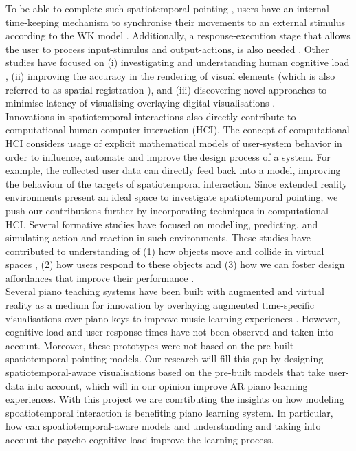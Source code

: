 \documentclass[manuscript,screen]{acmart}
\begin{document}
To be able to complete such spatiotemporal pointing \cite{lee2016modelling}, users have an internal time-keeping mechanism to synchronise their movements to an external stimulus according to the WK model \cite{wing1973response}. Additionally, a response-execution stage that allows the user to process input-stimulus and output-actions, is also needed \cite{wing1973timing}. Other studies have focused on (i) investigating and understanding human cognitive load \cite{radu2009augmented}, (ii) improving the accuracy in the rendering of visual elements (which is also referred to as spatial registration \cite{zheng2013general}), and (iii) discovering novel approaches to minimise latency of visualising overlaying digital visualisations \cite{serafin2017considerations}. \\

Innovations in spatiotemporal interactions also directly contribute to computational human-computer interaction (HCI). The concept of computational HCI considers usage of explicit mathematical models of user-system behavior in order to influence, automate and improve the design process of a system. For example, the collected user data can directly feed back into a model, improving the behaviour of the targets of spatiotemporal interaction. Since extended reality environments present an ideal space to investigate spatiotemporal pointing, we push our contributions further by incorporating techniques in computational HCI. Several formative studies have focused on modelling, predicting, and simulating action and reaction in such environments. These studies have contributed to understanding of (1) how objects move and collide in virtual spaces \cite{lee2017boxer}, (2) how users respond to these objects \cite{lee2016modelling} and (3) how we can foster design affordances that improve their performance \cite{rogers2014piano}.\\

Several piano teaching systems have been built with augmented and virtual reality as a medium for innovation by overlaying augmented time-specific visualisations over piano keys to improve music learning experiences \cite{rogers2014piano, sun2018mr, birhanu2017keynvision}. However, cognitive load and user response times have not been observed and taken into account. Moreover, these prototypes were not based on the pre-built spatiotemporal pointing models. Our research will fill this gap by designing spatiotemporal-aware visualisations based on the pre-built models that take user-data into account, which will in our opinion improve AR piano learning experiences. With this project we are conrtibuting the insights on how modeling spoatiotemporal interaction is benefiting piano learning system. In particular, how can spoatiotemporal-aware models and understanding and taking into account the psycho-cognitive load improve the learning process. 
\end{document}

